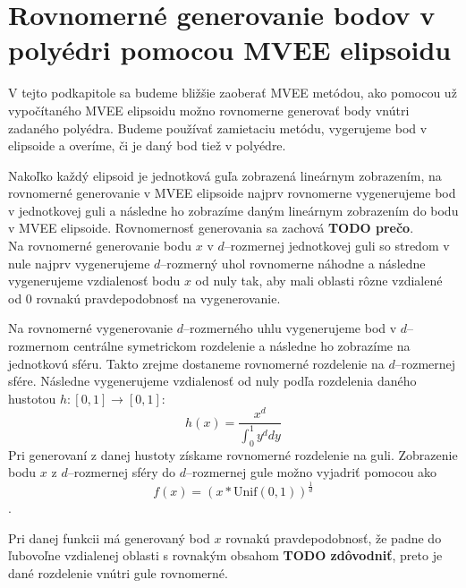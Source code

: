 \section {Rovnomerné generovanie bodov v polyédri pomocou MVEE elipsoidu}

V tejto podkapitole sa budeme bližšie zaoberať MVEE metódou, ako pomocou už vypočítaného MVEE elipsoidu možno rovnomerne generovať body vnútri zadaného polyédra. Budeme používať zamietaciu metódu, vygerujeme bod v elipsoide a overíme, či je daný bod tiež v polyédre.

Nakoľko každý elipsoid je jednotková guľa zobrazená lineárnym zobrazením, na rovnomerné generovanie v MVEE elipsoide najprv rovnomerne vygenerujeme bod v jednotkovej guli a následne ho zobrazíme daným lineárnym zobrazením do bodu v MVEE elipsoide. Rovnomernosť generovania sa zachová \textbf{TODO prečo}.\\

Na rovnomerné generovanie bodu $x$ v $d$--rozmernej jednotkovej guli so stredom v nule najprv vygenerujeme $d$--rozmerný uhol rovnomerne náhodne a následne vygenerujeme vzdialenosť bodu $x$ od nuly tak, aby mali oblasti rôzne vzdialené od $0$ rovnakú pravdepodobnosť na vygenerovanie.

Na rovnomerné vygenerovanie $d$--rozmerného uhlu vygenerujeme bod v $d$--rozmernom centrálne symetrickom rozdelenie a následne ho zobrazíme na jednotkovú sféru. Takto zrejme dostaneme rovnomerné rozdelenie na $d$--rozmernej sfére. Následne vygenerujeme vzdialenosť od nuly podľa rozdelenia daného hustotou $h:[0,1] \rightarrow [0,1]$: $$h(x)=\frac{x^d}{\int_0^1 y^d dy}$$
Pri generovaní z danej hustoty získame rovnomerné rozdelenie na guli. Zobrazenie bodu $x$ z $d$--rozmernej sféry do $d$--rozmernej gule možno vyjadriť pomocou  ako $$f(x)=(x*\text{Unif}(0,1))^{\frac{1}{d}}$$.

Pri danej funkcii má generovaný bod $x$ rovnakú pravdepodobnosť, že padne do ľubovoľne vzdialenej oblasti s rovnakým obsahom \textbf{TODO zdôvodniť}, preto je dané rozdelenie vnútri gule rovnomerné.